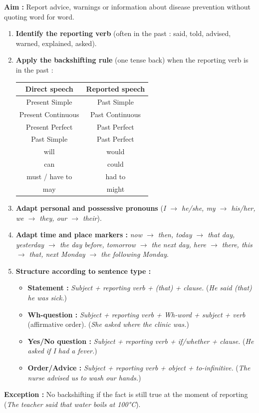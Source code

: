 \documentclass[11pt]{article}
\newcommand{\cle}[1]{{\popxbold\color{popdark}#1}}
\begin{document}
\begin{methode}
\textbf{Aim :} Report advice, warnings or information about disease prevention without quoting word for word.
\begin{enumerate}
    \item \textbf{Identify the reporting verb} (often in the past : \cle{said}, \cle{told}, \cle{advised}, \cle{warned}, \cle{explained}, \cle{asked}).
    \item \textbf{Apply the \cle{backshifting} rule} (one tense back) when the reporting verb is in the past :
    \begin{center}
    \begin{tabular}{|c|c|}\hline
    \textbf{Direct speech} & \textbf{Reported speech} \\ \hline
    Present Simple & Past Simple \\
    Present Continuous & Past Continuous \\
    Present Perfect & Past Perfect \\
    Past Simple & Past Perfect \\
    \cle{will} & \cle{would} \\
    \cle{can} & \cle{could} \\
    \cle{must} / \cle{have to} & \cle{had to} \\
    \cle{may} & \cle{might} \\ \hline
    \end{tabular}
    \end{center}
    \item \textbf{Adapt personal and possessive pronouns} (\textit{I $\rightarrow$ he/she, my $\rightarrow$ his/her, we $\rightarrow$ they, our $\rightarrow$ their}).
    \item \textbf{Adapt time and place markers :} \textit{now $\rightarrow$ then, today $\rightarrow$ that day, yesterday $\rightarrow$ the day before, tomorrow $\rightarrow$ the next day, here $\rightarrow$ there, this $\rightarrow$ that, next Monday $\rightarrow$ the following Monday}.
    \item \textbf{Structure according to sentence type :}
    \begin{itemize}
        \item \textbf{Statement :} \textit{Subject + reporting verb + (that) + clause.} (\textit{He said (that) he was sick.})
        \item \textbf{Wh-question :} \textit{Subject + reporting verb + Wh-word + subject + verb} (affirmative order). (\textit{She asked where the clinic was.})
        \item \textbf{Yes/No question :} \textit{Subject + reporting verb + if/whether + clause.} (\textit{He asked if I had a fever.})
        \item \textbf{Order/Advice :} \textit{Subject + reporting verb + object + to-infinitive.} (\textit{The nurse advised us \cle{to wash} our hands.})
    \end{itemize}
\end{enumerate}
\textbf{Exception :} No backshifting if the fact is still true at the moment of reporting (\textit{The teacher said that water \cle{boils} at 100°C}).
\end{methode}
\end{document}
